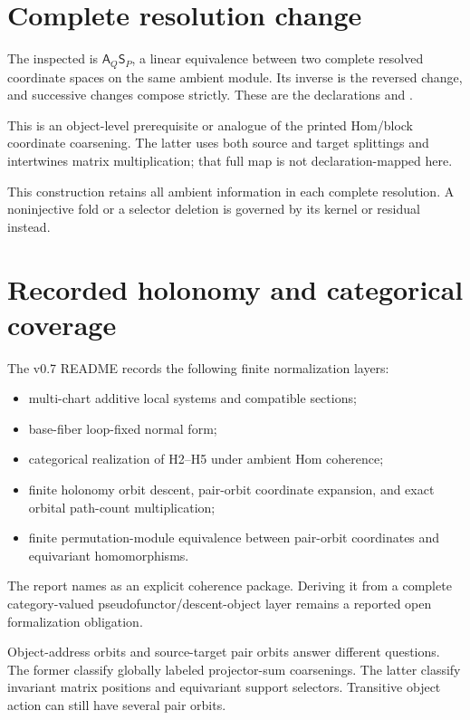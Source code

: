 \documentclass[11pt]{article}
\begin{document}
\section{Complete resolution change}
The inspected \texttt{} is
\(\mathsf A_Q\mathsf S_P\), a linear equivalence between two complete
resolved coordinate spaces on the same ambient module. Its inverse is the
reversed change, and successive changes compose strictly. These are the
declarations \texttt{} and
\texttt{}.

This is an object-level prerequisite or analogue of the printed
Hom/block coordinate coarsening. The latter uses both source and target
splittings and intertwines matrix multiplication; that full map is not
declaration-mapped here.

This construction retains all ambient information in each complete
resolution. A noninjective fold or a selector deletion is governed by its
kernel or residual instead.

\section{Recorded holonomy and categorical coverage}
The v0.7 README records the following finite normalization layers:
\begin{itemize}
\item multi-chart additive local systems and compatible sections;
\item base-fiber loop-fixed normal form;
\item categorical realization of H2--H5 under ambient Hom coherence;
\item finite holonomy orbit descent, pair-orbit coordinate expansion,
and exact orbital path-count multiplication;
\item finite permutation-module equivalence between pair-orbit coordinates
and equivariant homomorphisms.
\end{itemize}
The report names \texttt{} as an explicit coherence package.
Deriving it from a complete category-valued pseudofunctor/descent-object
layer remains a reported open formalization obligation.

Object-address orbits and source-target pair orbits answer different
questions. The former classify globally labeled projector-sum coarsenings.
The latter classify invariant matrix positions and equivariant support
selectors. Transitive object action can still have several pair orbits.
\end{document}
